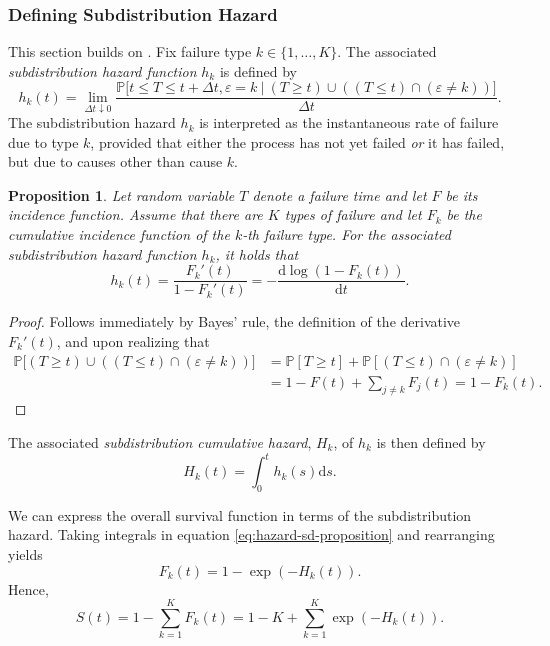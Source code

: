 \documentclass[11pt]{article}
\renewcommand{\P}{\mathbb{P}}
\renewcommand{\d}{\text{d}}
\newtheorem{proposition}[theorem]{Proposition}
\begin{document}
\subsubsection{Defining Subdistribution Hazard}
This section builds on \cite{fine1999proportional}. Fix failure type $k \in \{1,\dots, K\}$. The associated \textit{subdistribution hazard function} $h_k$ is defined by 
\begin{equation} \label{eq:hazard-sd}
	h_k(t) = \lim_{\Delta t\downarrow 0} \frac{ \P\big[t \leq T \leq  t + \Delta t, \varepsilon = k\ |\ (T \geq t) \cup ( (T \leq t) \cap (\varepsilon \neq k) )\big] }{\Delta t}.
\end{equation}
The subdistribution hazard $h_k$ is interpreted as the instantaneous rate of failure due to type $k$, provided that either the process has not yet failed \textit{or} it has failed, but due to causes other than cause $k$.
\begin{proposition}
Let random variable $T$ denote a failure time and let $F$ be its incidence function. Assume that there are $K$ types of failure and let $F_k$ be the cumulative incidence function of the $k$-th failure type. For the associated subdistribution hazard function $h_k$, it holds that
\begin{equation} \label{eq:hazard-sd-proposition}
	h_k(t) = \frac{F_k'(t)}{1 - F_k'(t)} = - \frac{\d \log (1 - F_k(t))}{\d t}.
\end{equation}
\end{proposition}
\begin{proof}
	Follows immediately by Bayes' rule, the definition of the derivative $F_k'(t)$, and upon realizing that
\begin{align*}
	\P\big[(T \geq t) \cup ( (T \leq t) \cap (\varepsilon \neq k) )\big]  
	&=
	\P[ T \geq t ] + \P[ (T \leq t ) \cap (\varepsilon \neq k) ]
	\\
	&=
	1 - F(t) + \sum_{j \neq k} F_j(t) = 1 - F_k(t).
\end{align*}
\end{proof}
The associated \textit{subdistribution cumulative hazard}, $H_k$, of $h_k$ is then defined by
\[
	H_k(t) = \int_0^t h_k(s) \d s.
\]

We can express the overall survival function in terms of the subdistribution hazard. Taking integrals in equation \eqref{eq:hazard-sd-proposition} and rearranging yields
\[
	F_k(t) = 1 - \exp\left( -H_k(t) \right).
\]
Hence,
\[
	S(t) = 1 - \sum_{k=1}^K F_k(t) = 1 - K + \sum_{k=1}^K \exp\left( -H_k(t) \right).
\]
\end{document}
